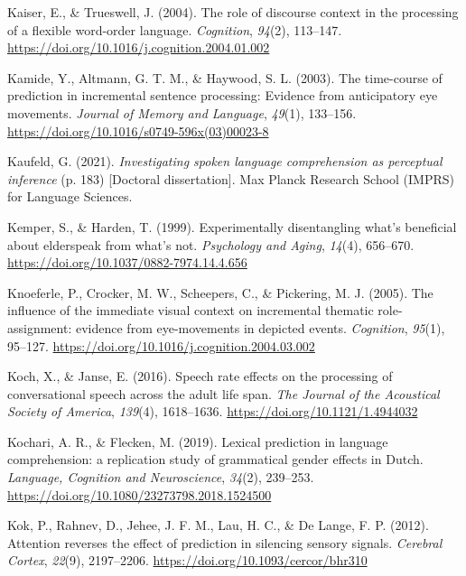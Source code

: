 \documentclass[a4paper, nobind]{templates/ociamthesis}
\newlength{\cslhangindent}
\newenvironment{CSLReferences}[2] %
 {%
  \setlength{\parindent}{0pt}
  \ifodd #1
  \let\oldpar\par
  \def\par{\hangindent=\cslhangindent\oldpar}
  \fi
  \setlength{\parskip}{1mm}
  \setlength{\baselineskip}{6mm}
 }%
 {}
\begin{document}
\begin{CSLReferences}{1}{0}
\leavevmode{}%
Kaiser, E., \& Trueswell, J. (2004). The role of discourse context in the processing of a flexible word-order language. \emph{Cognition}, \emph{94}(2), 113--147. \url{https://doi.org/10.1016/j.cognition.2004.01.002}

\leavevmode{}%
Kamide, Y., Altmann, G. T. M., \& Haywood, S. L. (2003). The time-course of prediction in incremental sentence processing: Evidence from anticipatory eye movements. \emph{Journal of Memory and Language}, \emph{49}(1), 133--156. \url{https://doi.org/10.1016/s0749-596x(03)00023-8}

\leavevmode{}%
Kaufeld, G. (2021). \emph{Investigating spoken language comprehension as perceptual inference} (p. 183) {[}Doctoral dissertation{]}. Max Planck Research School (IMPRS) for Language Sciences.

\leavevmode{}%
Kemper, S., \& Harden, T. (1999). {Experimentally disentangling what's beneficial about elderspeak from what's not}. \emph{Psychology and Aging}, \emph{14}(4), 656--670. \url{https://doi.org/10.1037/0882-7974.14.4.656}

\leavevmode{}%
Knoeferle, P., Crocker, M. W., Scheepers, C., \& Pickering, M. J. (2005). The influence of the immediate visual context on incremental thematic role-assignment: evidence from eye-movements in depicted events. \emph{Cognition}, \emph{95}(1), 95--127. \url{https://doi.org/10.1016/j.cognition.2004.03.002}

\leavevmode{}%
Koch, X., \& Janse, E. (2016). {Speech rate effects on the processing of conversational speech across the adult life span}. \emph{The Journal of the Acoustical Society of America}, \emph{139}(4), 1618--1636. \url{https://doi.org/10.1121/1.4944032}

\leavevmode{}%
Kochari, A. R., \& Flecken, M. (2019). {Lexical prediction in language comprehension: a replication study of grammatical gender effects in Dutch}. \emph{Language, Cognition and Neuroscience}, \emph{34}(2), 239--253. \url{https://doi.org/10.1080/23273798.2018.1524500}

\leavevmode{}%
Kok, P., Rahnev, D., Jehee, J. F. M., Lau, H. C., \& De Lange, F. P. (2012). {Attention reverses the effect of prediction in silencing sensory signals}. \emph{Cerebral Cortex}, \emph{22}(9), 2197--2206. \url{https://doi.org/10.1093/cercor/bhr310}


\end{CSLReferences}
\end{document}

